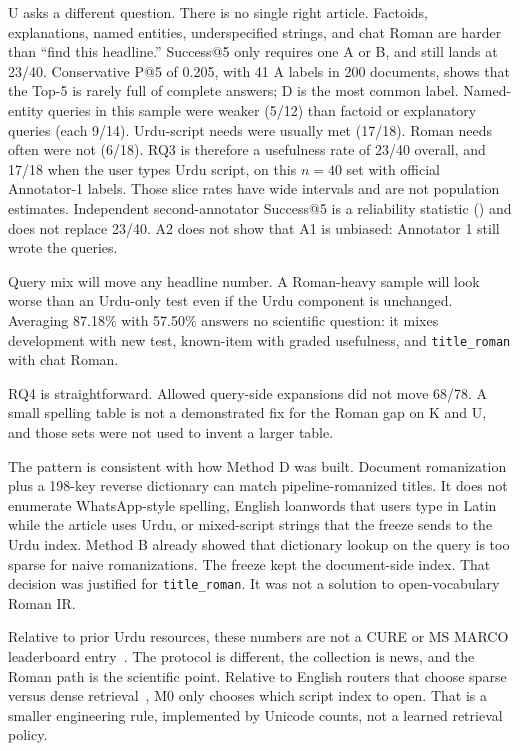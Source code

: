 \documentclass[10pt,letterpaper]{article}
\begin{document}
U asks a different question. There is no single right article. Factoids, explanations, named entities, underspecified strings, and chat Roman are harder than ``find this headline.'' Success@5 only requires one A or B, and still lands at 23/40. Conservative P@5 of 0.205, with 41 A labels in 200 documents, shows that the Top-5 is rarely full of complete answers; D is the most common label. Named-entity queries in this sample were weaker (5/12) than factoid or explanatory queries (each 9/14). Urdu-script needs were usually met (17/18). Roman needs often were not (6/18). RQ3 is therefore a usefulness rate of 23/40 overall, and 17/18 when the user types Urdu script, on this $n = 40$ set with official Annotator-1 labels. Those slice rates have wide intervals and are not population estimates. Independent second-annotator Success@5 is a reliability statistic () and does not replace 23/40. A2 does not show that A1 is unbiased: Annotator 1 still wrote the queries.

Query mix will move any headline number. A Roman-heavy sample will look worse than an Urdu-only test even if the Urdu component is unchanged. Averaging 87.18\% with 57.50\% answers no scientific question: it mixes development with new test, known-item with graded usefulness, and \texttt{title\_roman} with chat Roman.

RQ4 is straightforward. Allowed query-side expansions did not move 68/78. A small spelling table is not a demonstrated fix for the Roman gap on K and U, and those sets were not used to invent a larger table.

The pattern is consistent with how Method D was built. Document romanization plus a 198-key reverse dictionary can match pipeline-romanized titles. It does not enumerate WhatsApp-style spelling, English loanwords that users type in Latin while the article uses Urdu, or mixed-script strings that the freeze sends to the Urdu index. Method B already showed that dictionary lookup on the query is too sparse for naive romanizations. The freeze kept the document-side index. That decision was justified for \texttt{title\_roman}. It was not a solution to open-vocabulary Roman IR.

Relative to prior Urdu resources, these numbers are not a CURE or MS MARCO leaderboard entry~\cite{bib5,bib6}. The protocol is different, the collection is news, and the Roman path is the scientific point. Relative to English routers that choose sparse versus dense retrieval~\cite{bib11}, M0 only chooses which script index to open. That is a smaller engineering rule, implemented by Unicode counts, not a learned retrieval policy.
\end{document}
